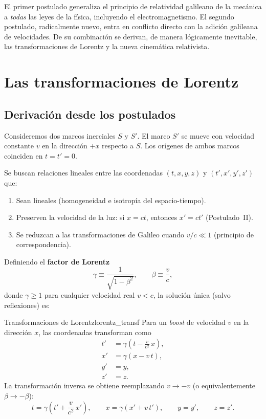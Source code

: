 El primer postulado generaliza el principio de relatividad galileano de la mecánica a \emph{todas} las leyes de la física, incluyendo el electromagnetismo. El segundo postulado, radicalmente nuevo, entra en conflicto directo con la adición galileana de velocidades. De su combinación se derivan, de manera lógicamente inevitable, las transformaciones de Lorentz y la nueva cinemática relativista.

\section{Las transformaciones de Lorentz}

\subsection{Derivación desde los postulados}

Consideremos dos marcos inerciales $S$ y $S'$. El marco $S'$ se mueve con velocidad constante $v$ en la dirección $+x$ respecto a $S$. Los orígenes de ambos marcos coinciden en $t = t' = 0$.

Se buscan relaciones lineales entre las coordenadas $(t, x, y, z)$ y $(t', x', y', z')$ que:
\begin{enumerate}[leftmargin=2em]
  \item Sean lineales (homogeneidad e isotropía del espacio-tiempo).
  \item Preserven la velocidad de la luz: si $x = ct$, entonces $x' = ct'$ (Postulado~II).
  \item Se reduzcan a las transformaciones de Galileo cuando $v/c \ll 1$ (principio de correspondencia).
\end{enumerate}

Definiendo el \textbf{factor de Lorentz}
\begin{equation}
  \gamma \equiv \frac{1}{\sqrt{1 - \beta^2}}, \qquad \beta \equiv \frac{v}{c},
  \label{eq:gamma}
\end{equation}
donde $\gamma \geq 1$ para cualquier velocidad real $v < c$, la solución única (salvo reflexiones) es:

\begin{teorema}{Transformaciones de Lorentz}{lorentz_transf}
Para un \emph{boost} de velocidad $v$ en la dirección $x$, las coordenadas transforman como
\begin{align}
  t'  &= \gamma\!\left(t - \frac{v}{c^2}\,x\right), \label{eq:lt1}\\[4pt]
  x'  &= \gamma\!\left(x - v\,t\right), \label{eq:lt2}\\[4pt]
  y'  &= y, \label{eq:lt3}\\[4pt]
  z'  &= z. \label{eq:lt4}
\end{align}
La transformación inversa se obtiene reemplazando $v \to -v$ (o equivalentemente $\beta \to -\beta$):
\begin{equation}
  t = \gamma\!\left(t' + \frac{v}{c^2}\,x'\right),\qquad
  x = \gamma\left(x' + v\,t'\right),\qquad
  y = y',\qquad z = z'.
  \label{eq:lt_inv}
\end{equation}
\end{teorema}

